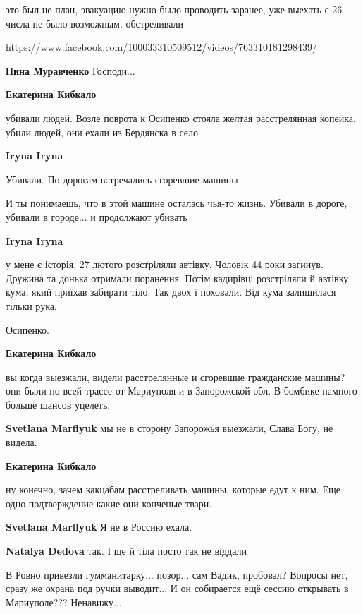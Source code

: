\begin{itemize}

это был не план, эвакуацию нужно было проводить заранее, уже выехать с 26 числа
не было возможным. обстреливали

\url{https://www.facebook.com/100033310509512/videos/763310181298439/}

\textbf{Нина Муравченко} Господи...

\textbf{Екатерина Кибкало} 

убивали людей. Возле поврота к Осипенко стояла желтая расстрелянная копейка,
убили людей, они ехали из Бердянска в село

\textbf{Iryna Iryna} 

Убивали. По дорогам встречались сгоревшие машины

И ты понимаешь, что в этой машине осталась чья-то жизнь. Убивали в дороге,
убивали в городе... и продолжают убивать

\textbf{Iryna Iryna} 

у мене є історія. 27 лютого розстріляли автівку. Чоловік 44 роки загинув.
Дружина та донька отримали поранення. Потім кадирівці розстріляли й автівку
кума, який приїхав забирати тіло. Так двох і поховали. Від кума залишилася
тільки рука.

Осипенко.

\textbf{Екатерина Кибкало} 

вы когда выезжали, видели расстрелянные и сгоревшие гражданские машины? они были
по всей трассе-от Мариуполя и в Запорожской обл. В бомбике намного больше шансов
уцелеть.

\textbf{Svetlana Marflyuk} мы не в сторону Запорожья выезжали, Слава Богу, не видела.

\textbf{Екатерина Кибкало} 

ну конечно, зачем какцабам расстреливать машины, которые едут к ним. Еще одно
подтверждение какие они конченые твари.

\textbf{Svetlana Marflyuk} Я не в Россию ехала.

\textbf{Natalya Dedova} так. І ще й тіла посто так не віддали

\end{itemize} %


В Ровно привезли гумманитарку... позор... сам Вадик, пробовал? Вопросы нет, сразу же
охрана под ручки выводит... И он собирается ещё сессию открывать в
Мариуполе??? Ненавижу...

